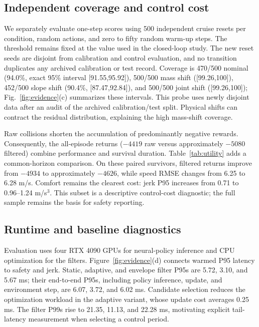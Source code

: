 \subsection{Independent coverage and control cost}
We separately evaluate one-step scores using 500 independent cruise resets
per condition, random actions, and zero to fifty random warm-up steps.
The threshold remains fixed at the value used in the closed-loop study.
The new reset seeds are disjoint from calibration and control evaluation,
and no transition duplicates any archived calibration or test record.
Coverage is 470/500 nominal (94.0\%, exact 95\% interval
[91.55,95.92]), 500/500 mass shift ([99.26,100]),
452/500 slope shift (90.4\%, [87.47,92.84]), and 500/500 joint shift
([99.26,100]); Fig.~\ref{fig:evidence}(c) summarizes these intervals. This
probe uses newly disjoint data after an audit of the
archived calibration/test split. Physical shifts can contract the residual
distribution, explaining the high mass-shift coverage.

\begin{table}[t]
\caption{Control performance on the 1,496 paired episodes where all four
methods complete 500 steps. Speed/gap: RMSE in m/s and m; jerk: mean
episode P95 in m/s$^3$; return: accumulated reward.}
\label{tab:utility}
\centering
\setlength{\tabcolsep}{5pt}

\end{table}

Raw collisions shorten the accumulation of predominantly negative rewards.
Consequently, the all-episode returns ($-4419$ raw versus approximately
$-5080$ filtered) combine performance and survival duration.
Table~\ref{tab:utility} adds a common-horizon comparison. On these paired
survivors, filtered returns improve from $-4934$ to approximately $-4626$,
while speed RMSE changes from 6.25 to 6.28 m/s. Comfort remains the
clearest cost: jerk P95 increases from 0.71 to 0.96--1.24 m/s$^3$.
This subset is a descriptive control-cost diagnostic; the full sample
remains the basis for safety reporting.



\subsection{Runtime and baseline diagnostics}
Evaluation uses four RTX 4090 GPUs for neural-policy inference and CPU
optimization for the filters. Figure~\ref{fig:evidence}(d) connects warmed
P95 latency to safety and jerk. Static, adaptive, and envelope filter P95s
are 5.72, 3.10, and 5.67 ms; their end-to-end P95s, including policy
inference, update, and environment step, are 6.07, 3.72, and 6.02 ms.
Candidate selection reduces the optimization workload in the adaptive
variant, whose update cost averages 0.25 ms. The filter P99s rise to
21.35, 11.13, and 22.28 ms, motivating explicit tail-latency measurement
when selecting a control period.

